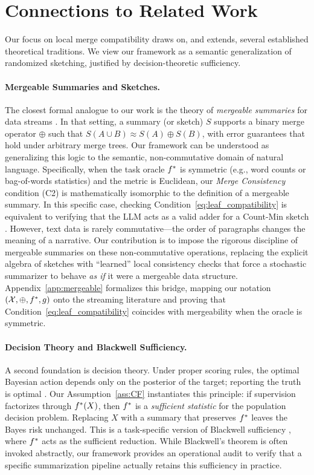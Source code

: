 \section{Connections to Related Work}\label{sec:related}

Our focus on local merge compatibility draws on, and extends, several established theoretical traditions. We view our framework as a semantic generalization of randomized sketching, justified by decision-theoretic sufficiency.

\paragraph{Mergeable Summaries and Sketches.} 
The closest formal analogue to our work is the theory of \emph{mergeable summaries} for data streams \citep{Agarwal2013MergeableTODS}. In that setting, a summary (or sketch) $S$ supports a binary merge operator $\oplus$ such that $S(A \cup B) \approx S(A) \oplus S(B)$, with error guarantees that hold under arbitrary merge trees. 
Our framework can be understood as generalizing this logic to the semantic, non-commutative domain of natural language.
Specifically, when the task oracle $f^{\ast}$ is symmetric (e.g., word counts or bag-of-words statistics) and the metric is Euclidean, our \emph{Merge Consistency} condition (C2) is mathematically isomorphic to the definition of a mergeable summary. In this specific case, checking Condition~\eqref{eq:leaf_compatibility} is equivalent to verifying that the LLM acts as a valid adder for a Count-Min sketch \citep{CormodeMuthukrishnan2005}.
However, text data is rarely commutative---the order of paragraphs changes the meaning of a narrative. Our contribution is to impose the rigorous discipline of mergeable summaries on these non-commutative operations, replacing the explicit algebra of sketches with ``learned'' local consistency checks that force a stochastic summarizer to behave \emph{as if} it were a mergeable data structure.
Appendix~\ref{app:mergeable} formalizes this bridge, mapping our notation $(\mathcal{X},\oplus,f^{\ast},g)$ onto the streaming literature and proving that Condition~\eqref{eq:leaf_compatibility} coincides with mergeability when the oracle is symmetric.

\paragraph{Decision Theory and Blackwell Sufficiency.}
A second foundation is decision theory. Under proper scoring rules, the optimal Bayesian action depends only on the posterior of the target; reporting the truth is optimal \citep{GneitingRaftery2007,Dawid2007}. Our Assumption~\ref{ass:CF} instantiates this principle: if supervision factorizes through $f^{\ast}(X)$, then $f^{\ast}$ is a \emph{sufficient statistic} for the population decision problem. Replacing $X$ with a summary that preserves $f^{\ast}$ leaves the Bayes risk unchanged. This is a task-specific version of Blackwell sufficiency \citep{Blackwell1953,Torgersen1991}, where $f^{\ast}$ acts as the sufficient reduction. While Blackwell's theorem is often invoked abstractly, our framework provides an operational audit to verify that a specific summarization pipeline actually retains this sufficiency in practice.

